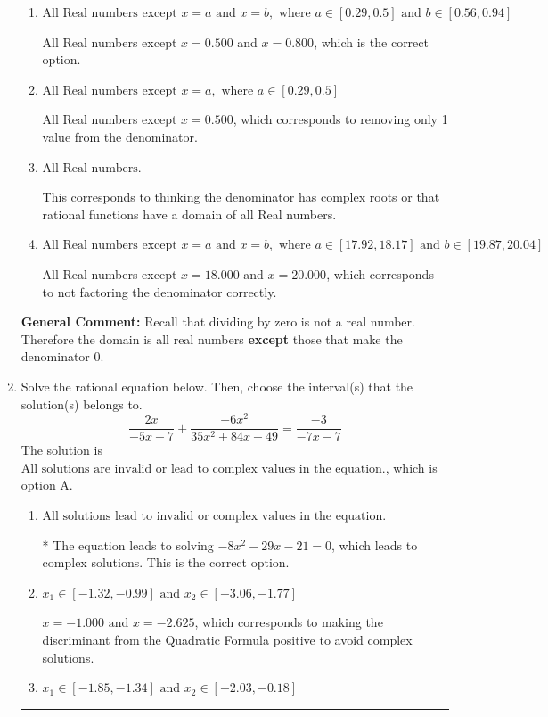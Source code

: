 \documentclass{extbook}[14pt]
\newcommand{\litem}[1]{\item #1

\rule{\textwidth}{0.4pt}}
\begin{document}
\begin{enumerate}
{\begin{enumerate}[label=\Alph*.]
All Real numbers except $x = 18.000$, which corresponds to removing a distractor value from the denominator.
\item \( \text{All Real numbers except } x = a \text{ and } x = b, \text{ where } a \in [0.29, 0.5] \text{ and } b \in [0.56, 0.94] \)

All Real numbers except $x = 0.500$ and $x = 0.800$, which is the correct option.
\item \( \text{All Real numbers except } x = a, \text{ where } a \in [0.29, 0.5] \)

All Real numbers except $x = 0.500$, which corresponds to removing only 1 value from the denominator.
\item \( \text{All Real numbers.} \)

This corresponds to thinking the denominator has complex roots or that rational functions have a domain of all Real numbers.
\item \( \text{All Real numbers except } x = a \text{ and } x = b, \text{ where } a \in [17.92, 18.17] \text{ and } b \in [19.87, 20.04] \)

All Real numbers except $x = 18.000$ and $x = 20.000$, which corresponds to not factoring the denominator correctly.
\end{enumerate}

\textbf{General Comment:} Recall that dividing by zero is not a real number. Therefore the domain is all real numbers \textbf{except} those that make the denominator 0.
}
\litem{
Solve the rational equation below. Then, choose the interval(s) that the solution(s) belongs to.
\[ \frac{2x}{-5x -7} + \frac{-6x^{2}}{35x^{2} +84 x + 49} = \frac{-3}{-7x -7} \]The solution is \( \text{All solutions are invalid or lead to complex values in the equation.} \), which is option A.\begin{enumerate}[label=\Alph*.]
\item \( \text{All solutions lead to invalid or complex values in the equation.} \)

* The equation leads to solving $-8x^{2} -29 x -21=0$, which leads to complex solutions. This is the correct option.
\item \( x_1 \in [-1.32, -0.99] \text{ and } x_2 \in [-3.06,-1.77] \)

$x = -1.000 \text{ and } x = -2.625$, which corresponds to making the discriminant from the Quadratic Formula positive to avoid complex solutions.
\item \( x_1 \in [-1.85, -1.34] \text{ and } x_2 \in [-2.03,-0.18] \)


\end{enumerate}}
\end{enumerate}
\end{document}
